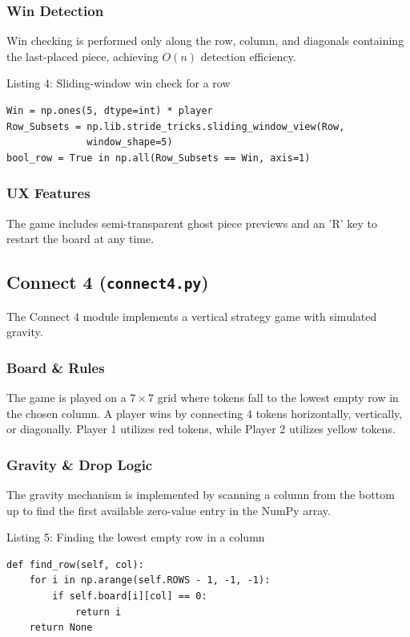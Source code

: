 \documentclass[12pt]{article}
\begin{document}
\subsubsection*{Win Detection}
Win checking is performed only along the row, column, and diagonals containing the last-placed piece, achieving $O(n)$ detection efficiency.

\begin{center}
Listing 4: Sliding-window win check for a row
\end{center}
\begin{lstlisting}[style=pythonstyle]
Win = np.ones(5, dtype=int) * player
Row_Subsets = np.lib.stride_tricks.sliding_window_view(Row,
              window_shape=5)
bool_row = True in np.all(Row_Subsets == Win, axis=1)
\end{lstlisting}

\subsubsection*{UX Features}
The game includes semi-transparent ghost piece previews and an 'R' key to restart the board at any time.

\subsection{Connect 4 (\texttt{connect4.py})}
The Connect 4 module implements a vertical strategy game with simulated gravity.

\subsubsection*{Board \& Rules}
The game is played on a $7 \times 7$ grid where tokens fall to the lowest empty row in the chosen column. A player wins by connecting 4 tokens horizontally, vertically, or diagonally. Player 1 utilizes red tokens, while Player 2 utilizes yellow tokens.

\subsubsection*{Gravity \& Drop Logic}
The gravity mechanism is implemented by scanning a column from the bottom up to find the first available zero-value entry in the NumPy array.

\begin{center}
Listing 5: Finding the lowest empty row in a column
\end{center}
\begin{lstlisting}[style=pythonstyle]
def find_row(self, col):
    for i in np.arange(self.ROWS - 1, -1, -1):
        if self.board[i][col] == 0:
            return i
    return None
\end{lstlisting}
\end{document}
